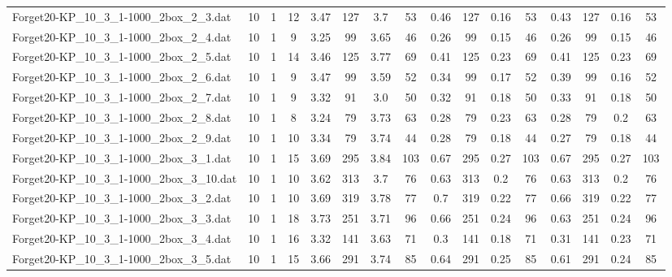 \begin{sidewaystable}[!ht]
{\begin{tabular}{lccccccccccccccc}
Forget20-KP\_10\_3\_1-1000\_2box\_2\_3.dat & 10 & 1 & 12 & 3.47 & 127 & 3.7 & 53 & 0.46 & 127 &  \textcolor{blue2}{0.16} & 53 & 0.43 & 127 &  \textcolor{blue2}{0.16} & 53 \\
Forget20-KP\_10\_3\_1-1000\_2box\_2\_4.dat & 10 & 1 & 9 & 3.25 & 99 & 3.65 & 46 & 0.26 & 99 &  \textcolor{blue2}{0.15} & 46 & 0.26 & 99 &  \textcolor{blue2}{0.15} & 46 \\
Forget20-KP\_10\_3\_1-1000\_2box\_2\_5.dat & 10 & 1 & 14 & 3.46 & 125 & 3.77 & 69 & 0.41 & 125 &  \textcolor{blue2}{0.23} & 69 & 0.41 & 125 &  \textcolor{blue2}{0.23} & 69 \\
Forget20-KP\_10\_3\_1-1000\_2box\_2\_6.dat & 10 & 1 & 9 & 3.47 & 99 & 3.59 & 52 & 0.34 & 99 & 0.17 & 52 & 0.39 & 99 &  \textcolor{blue2}{0.16} & 52 \\
Forget20-KP\_10\_3\_1-1000\_2box\_2\_7.dat & 10 & 1 & 9 & 3.32 & 91 & 3.0 & 50 & 0.32 & 91 &  \textcolor{blue2}{0.18} & 50 & 0.33 & 91 &  \textcolor{blue2}{0.18} & 50 \\
Forget20-KP\_10\_3\_1-1000\_2box\_2\_8.dat & 10 & 1 & 8 & 3.24 & 79 & 3.73 & 63 & 0.28 & 79 & 0.23 & 63 & 0.28 & 79 &  \textcolor{blue2}{0.2} & 63 \\
Forget20-KP\_10\_3\_1-1000\_2box\_2\_9.dat & 10 & 1 & 10 & 3.34 & 79 & 3.74 & 44 & 0.28 & 79 &  \textcolor{blue2}{0.18} & 44 & 0.27 & 79 &  \textcolor{blue2}{0.18} & 44 \\
Forget20-KP\_10\_3\_1-1000\_2box\_3\_1.dat & 10 & 1 & 15 & 3.69 & 295 & 3.84 & 103 & 0.67 & 295 &  \textcolor{blue2}{0.27} & 103 & 0.67 & 295 &  \textcolor{blue2}{0.27} & 103 \\
Forget20-KP\_10\_3\_1-1000\_2box\_3\_10.dat & 10 & 1 & 10 & 3.62 & 313 & 3.7 & 76 & 0.63 & 313 &  \textcolor{blue2}{0.2} & 76 & 0.63 & 313 &  \textcolor{blue2}{0.2} & 76 \\
Forget20-KP\_10\_3\_1-1000\_2box\_3\_2.dat & 10 & 1 & 10 & 3.69 & 319 & 3.78 & 77 & 0.7 & 319 & 0.22 & 77 & 0.66 & 319 & 0.22 & 77 \\
Forget20-KP\_10\_3\_1-1000\_2box\_3\_3.dat & 10 & 1 & 18 & 3.73 & 251 & 3.71 & 96 & 0.66 & 251 &  \textcolor{blue2}{0.24} & 96 & 0.63 & 251 &  \textcolor{blue2}{0.24} & 96 \\
Forget20-KP\_10\_3\_1-1000\_2box\_3\_4.dat & 10 & 1 & 16 & 3.32 & 141 & 3.63 & 71 & 0.3 & 141 &  \textcolor{blue2}{0.18} & 71 & 0.31 & 141 & 0.23 & 71 \\
Forget20-KP\_10\_3\_1-1000\_2box\_3\_5.dat & 10 & 1 & 15 & 3.66 & 291 & 3.74 & 85 & 0.64 & 291 & 0.25 & 85 & 0.61 & 291 &  \textcolor{blue2}{0.24} & 85 \\

\end{tabular}}
\end{sidewaystable}
